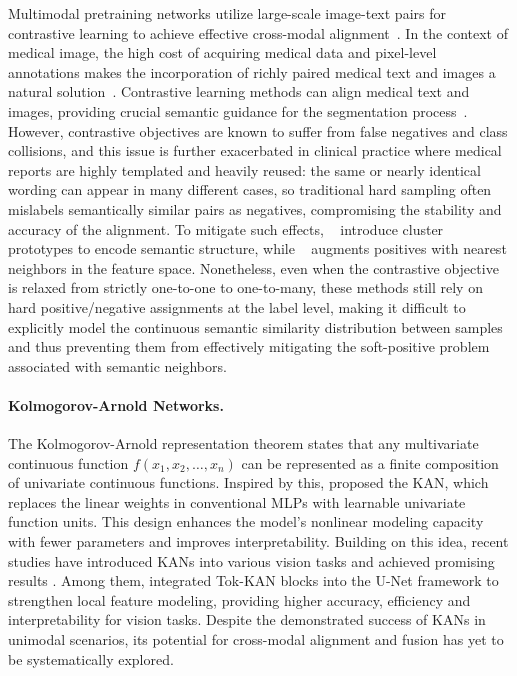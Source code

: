 \documentclass{article} %
\begin{document}
Multimodal pretraining networks utilize large-scale image-text pairs for contrastive learning to achieve effective cross-modal alignment~\citep{mukhoti2023open,chng2024mask,sung2024contextrast}. In the context of medical image, the high cost of acquiring medical data and pixel-level annotations makes the incorporation of richly paired medical text and images a natural solution~\citep{wang2022medclip,hu2023beyond}. Contrastive learning methods can align medical text and images, providing crucial semantic guidance for the segmentation process~\citep{pan2025dusss}. However, contrastive objectives are known to suffer from false negatives and class collisions, and this issue is further exacerbated in clinical practice where medical reports are highly templated and heavily reused: the same or nearly identical wording can appear in many different cases, so traditional hard sampling often mislabels semantically similar pairs as negatives, compromising the stability and accuracy of the alignment. To mitigate such effects, ~\citet{PCL} introduce cluster prototypes to encode semantic structure, while ~\citet{dwibedi2021little} augments positives with nearest neighbors in the feature space. Nonetheless, even when the contrastive objective is relaxed from strictly one-to-one to one-to-many, these methods still rely on hard positive/negative assignments at the label level, making it difficult to explicitly model the continuous semantic similarity distribution between samples and thus preventing them from effectively mitigating the soft-positive problem associated with semantic neighbors.

\paragraph{Kolmogorov-Arnold Networks.}

The Kolmogorov-Arnold representation theorem states that any multivariate continuous function $f(x_1, x_2, \ldots, x_n)$ can be represented as a finite composition of univariate continuous functions. Inspired by this, \citet{liu2025kan} proposed the KAN, which replaces the linear weights in conventional MLPs with learnable univariate function units. This design enhances the model’s nonlinear modeling capacity with fewer parameters and improves interpretability. Building on this idea, recent studies have introduced KANs into various vision tasks and achieved promising results \citep{chen2025sckansformer,zhang2025mm,wang2025medkaformer,zhu2026kanseg}. Among them, \citet{li2025u} integrated Tok-KAN blocks into the U-Net framework to strengthen local feature modeling, providing higher accuracy, efficiency and interpretability for vision tasks. Despite the demonstrated success of KANs in unimodal scenarios, its potential for cross-modal alignment and fusion has yet to be systematically explored.
\end{document}
